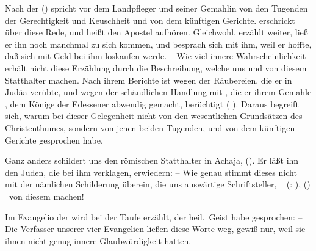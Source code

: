 \begin{aufza}
\begin{aufzb}
\item Nach der  () spricht  vor dem Landpfleger  und seiner Gemahlin  von den Tugenden der Gerechtigkeit und Keuschheit und von dem künftigen Gerichte.  erschrickt über diese Rede, und heißt den Apostel aufhören. Gleichwohl, erzählt  weiter, ließ er ihn noch manchmal zu sich kommen, und besprach sich mit ihm, weil er hoffte, daß  sich mit Geld bei ihm loskaufen werde. -- Wie viel innere Wahrscheinlichkeit erhält nicht diese Erzählung durch die Beschreibung, welche uns  und  von diesem Statthalter machen. Nach ihrem Berichte ist  wegen der Räubereien, die er in Judäa verübte, und wegen der schändlichen Handlung mit , die er ihrem Gemahle , dem Könige der Edessener abwendig gemacht, berüchtigt (  ). Daraus begreift sich, warum  bei dieser Gelegenheit nicht von den wesentlichen Grundsätzen des Christenthumes, sondern von jenen beiden Tugenden, und von dem künftigen Gerichte gesprochen habe, \usw\
\item Ganz anders schildert uns  den römischen Statthalter in Achaja,  (). Er läßt ihn den Juden, die  bei ihm verklagen, erwiedern:  -- Wie genau stimmt dieses nicht mit der nämlichen Schilderung überein, die uns auswärtige Schriftsteller, \zB\  (: ),  () \uA\ von diesem  machen!~
\end{aufzb}
\item {}
\begin{aufzb}
\item Im Evangelio der  wird bei der Taufe  erzählt, der heil.\ Geist habe gesprochen:  -- Die Verfasser unserer vier Evangelien ließen diese Worte weg, gewiß nur, weil sie ihnen nicht genug innere Glaubwürdigkeit hatten.

\end{aufzb}
\end{aufza}
